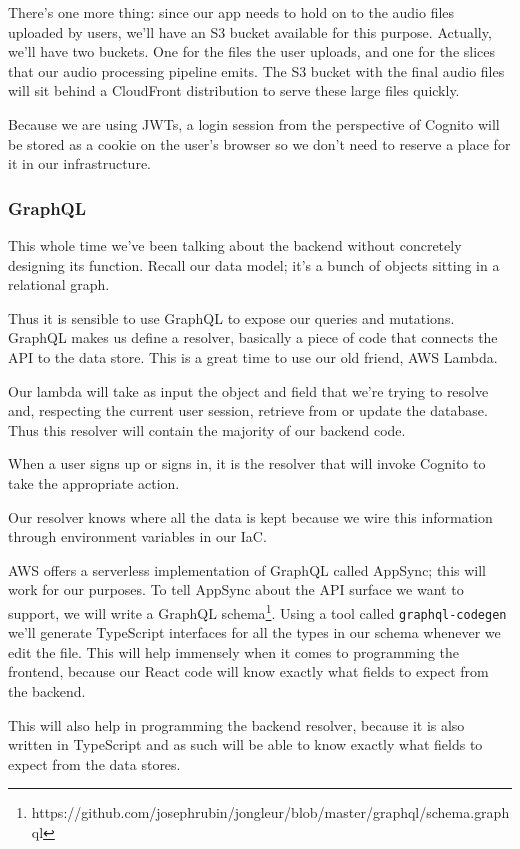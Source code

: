 \documentclass{article}
\begin{document}
There's one more thing: since our app needs to hold on to the audio files uploaded by users, we'll have an S3 bucket available for this purpose.
Actually, we'll have two buckets.
One for the files the user uploads, and one for the slices that our audio processing pipeline emits.
The S3 bucket with the final audio files will sit behind a CloudFront distribution to serve these large files quickly.

Because we are using JWTs, a login session from the perspective of Cognito will be stored as a cookie on the user's browser so we don't need to reserve a place for it in our infrastructure.

\subsubsection{GraphQL}

This whole time we've been talking about the backend without concretely designing its function.
Recall our data model; it's a bunch of objects sitting in a relational graph.

Thus it is sensible to use GraphQL to expose our queries and mutations.
GraphQL makes us define a resolver, basically a piece of code that connects the API to the data store.
This is a great time to use our old friend, AWS Lambda.

Our lambda will take as input the object and field that we're trying to resolve and, respecting the current user session, retrieve from or update the database.
Thus this resolver will contain the majority of our backend code.

When a user signs up or signs in, it is the resolver that will invoke Cognito to take the appropriate action.

Our resolver knows where all the data is kept because we wire this information through environment variables in our IaC.

AWS offers a serverless implementation of GraphQL called AppSync; this will work for our purposes.
To tell AppSync about the API surface we want to support, we will write a GraphQL schema\footnote{https://github.com/josephrubin/jongleur/blob/master/graphql/schema.graphql}.
Using a tool called \texttt{graphql-codegen} we'll generate TypeScript interfaces for all the types in our schema whenever we edit the file.
This will help immensely when it comes to programming the frontend, because our React code will know exactly what fields to expect from the backend.

This will also help in programming the backend resolver, because it is also written in TypeScript and as such will be able to know exactly what fields to expect from the data stores.
\end{document}
